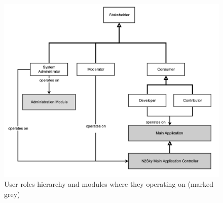 \begin{figure}[htbp]
\begin{center}
  \includegraphics[width=\linewidth]{components/4/users.png}
  \caption{User roles hierarchy and modules where they operating on (marked grey)}
  \label{fig:userroles}
\end{center}
\end{figure}

